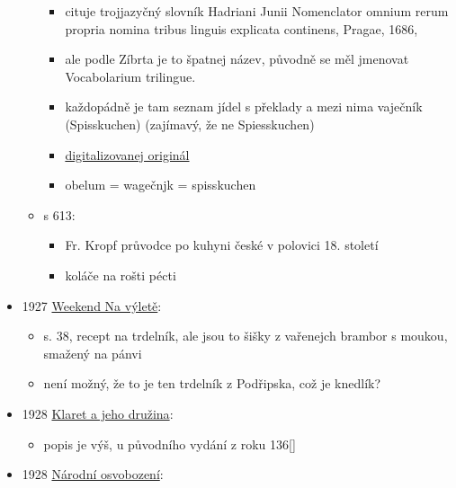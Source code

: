\begin{itemize}
\begin{itemize}
    \begin{itemize}
    \tightlist
    \item
      cituje trojjazyčný slovník Hadriani Junii Nomenclator omnium rerum
      propria nomina tribus linguis explicata continens, Pragae, 1686,
    \item
      ale podle Zíbrta je to špatnej název, původně se měl jmenovat
      Vocabolarium trilingue.
    \item
      každopádně je tam seznam jídel s překlady a mezi nima vaječník
      (Spisskuchen) (zajímavý, že ne Spiesskuchen)
    \item
      \href{https://www.digitale-sammlungen.de/view/bsb11105115?page=42\%2C43}{digitalizovanej
      originál}
    \item
      obelum = wagečnjk = spisskuchen
    \end{itemize}
  \item
    s 613:

    \begin{itemize}
    \tightlist
    \item
      Fr. Kropf průvodce po kuhyni české v polovici 18. století
    \item
      koláče na rošti pécti
    \end{itemize}
  \end{itemize}
\item
  1927
  \href{https://ndk.cz/view/uuid:a6e51320-373c-11ee-973a-005056827e51?page=uuid\%3A7905381e-5d69-48f7-97ca-9e0d2c8b5023&fulltext=trdeln\%C3\%ADk}{Weekend
  Na výletě}:

  \begin{itemize}
  \tightlist
  \item
    s. 38, recept na trdelník, ale jsou to šišky z vařenejch brambor s
    moukou, smažený na pánvi
  \item
    není možný, že to je ten trdelník z Podřipska, což je knedlík?
  \end{itemize}
\item
  1928
  \href{https://sources.cms.flu.cas.cz/src/index.php?s=v&bookid=833&page=3}{Klaret
  a jeho družina}:

  \begin{itemize}
  \tightlist
  \item
    popis je výš, u původního vydání z roku 136{[}{]}
  \end{itemize}
\item
  1928
  \href{https://ceskadigitalniknihovna.cz/view/uuid:f80a63e0-611a-11e1-acfb-0013d398622b?page=uuid\%3Ada4abcb0-9dd7-11e7-a093-005056825209&fulltext=trdlovec&source=nkp}{Národní
  osvobození}:


\end{itemize}
